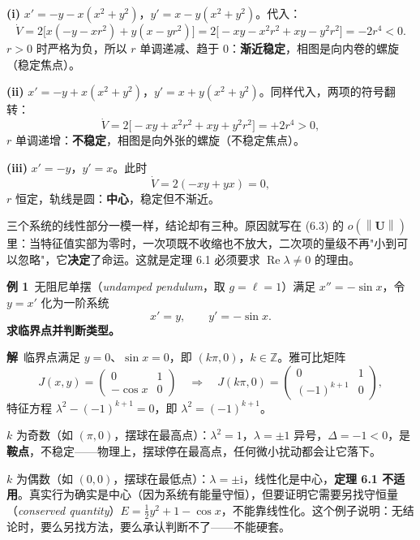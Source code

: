 \documentclass[11pt]{ctexart}
\newcommand{\U}{\mathbf{U}}
\newcommand{\Jac}{J}
\newcommand{\norm}[1]{\left\lVert#1\right\rVert}
\newcommand{\EN}[1]{\textcolor{inkgray}{\itshape #1}}
\begin{document}
\textbf{(i)} $x'=-y-x(x^{2}+y^{2})$，$y'=x-y(x^{2}+y^{2})$。代入：
\[
\dot V=2\big[x(-y-xr^{2})+y(x-yr^{2})\big]
=2\big[-xy-x^{2}r^{2}+xy-y^{2}r^{2}\big]=-2r^{4}<0 .
\]
$r>0$ 时严格为负，所以 $r$ 单调递减、趋于 $0$：\textbf{渐近稳定}，相图是向内卷的螺旋（稳定焦点）。

\textbf{(ii)} $x'=-y+x(x^{2}+y^{2})$，$y'=x+y(x^{2}+y^{2})$。同样代入，两项的符号翻转：
\[
\dot V=2\big[-xy+x^{2}r^{2}+xy+y^{2}r^{2}\big]=+2r^{4}>0 ,
\]
$r$ 单调递增：\textbf{不稳定}，相图是向外张的螺旋（不稳定焦点）。

\textbf{(iii)} $x'=-y$，$y'=x$。此时
\[
\dot V=2(-xy+yx)=0 ,
\]
$r$ 恒定，轨线是圆：\textbf{中心}，稳定但不渐近。

三个系统的线性部分一模一样，结论却有三种。原因就写在 (6.3) 的 $o(\norm{\U})$ 里：当特征值实部为零时，一次项既不收缩也不放大，二次项的量级不再"小到可以忽略"，它\textbf{决定}了命运。这就是定理 6.1 必须要求 $\operatorname{Re}\lambda\neq0$ 的理由。



\textbf{例 1}\ 无阻尼单摆（\EN{undamped pendulum}，取 $g=\ell=1$）满足 $x''=-\sin x$，令 $y=x'$ 化为一阶系统
\[
x'=y,\qquad y'=-\sin x .
\]
\textbf{求临界点并判断类型。}

\textbf{解}\ 临界点满足 $y=0$、$\sin x=0$，即 $(k\pi,0)$，$k\in\mathbb{Z}$。雅可比矩阵
\[
\Jac(x,y)=\begin{pmatrix}0&1\\-\cos x&0\end{pmatrix}
\quad\Longrightarrow\quad
\Jac(k\pi,0)=\begin{pmatrix}0&1\\(-1)^{k+1}&0\end{pmatrix},
\]
特征方程 $\lambda^{2}-(-1)^{k+1}=0$，即 $\lambda^{2}=(-1)^{k+1}$。

$k$ 为奇数（如 $(\pi,0)$，摆球在最高点）：$\lambda^{2}=1$，$\lambda=\pm1$ 异号，$\Delta=-1<0$，是\textbf{鞍点}，不稳定——物理上，摆球停在最高点，任何微小扰动都会让它落下。

$k$ 为偶数（如 $(0,0)$，摆球在最低点）：$\lambda=\pm\mathrm{i}$，线性化是中心，\textbf{定理 6.1 不适用}。真实行为确实是中心（因为系统有能量守恒），但要证明它需要另找守恒量（\EN{conserved quantity}）$E=\frac{1}{2}y^{2}+1-\cos x$，不能靠线性化。这个例子说明：无结论时，要么另找方法，要么承认判断不了——不能硬套。
\end{document}
